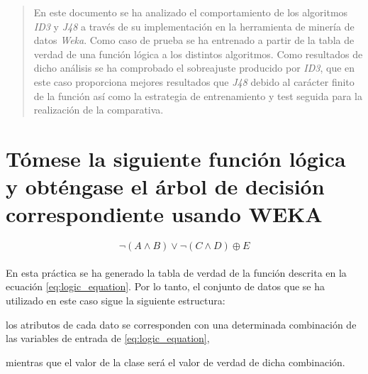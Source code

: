 \documentclass[10pt, a4paper,spanish]{article}
\begin{document}
	\maketitle %

	\thispagestyle{fancy} %



	\begin{abstract}
		\noindent En este documento se ha analizado el comportamiento de los algoritmos \emph{ID3} y \emph{J48} a través de su implementación en la herramienta de minería de datos \emph{Weka}\cite{tool:weka}. Como caso de prueba se ha entrenado a partir de la tabla de verdad de una función lógica a los distintos algoritmos. Como resultados de dicho análisis se ha comprobado el sobreajuste producido por \emph{ID3}, que en este caso proporciona mejores resultados que \emph{J48} debido al carácter finito de la función así como la estrategia de entrenamiento y test seguida para la realización de la comparativa.
	\end{abstract}



  \section{Tómese la siguiente función lógica y obténgase el árbol de decisión correspondiente usando WEKA\cite{tool:weka}}

		\begin{equation}
			\label{eq:logic_equation}
			\neg(A \land B) \lor \neg(C \land D) \oplus E
		\end{equation}

		\paragraph{}
		En esta práctica se ha generado la tabla de verdad de la función descrita en la ecuación \eqref{eq:logic_equation}. Por lo tanto, el conjunto de datos que se ha utilizado en este caso sigue la siguiente estructura:
		\begin{enumerate*} [label=\itshape\alph*\upshape)]
			\item los atributos de cada dato se corresponden con una determinada combinación de las variables de entrada de \eqref{eq:logic_equation},
			\item mientras que el valor de la clase será el valor de verdad de dicha combinación.
		\end{enumerate*}
\end{document}

